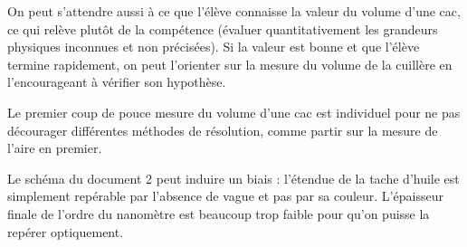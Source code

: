 \documentclass[12pt,a4paper]{article}
\begin{document}
On peut s'attendre aussi à ce que l'élève connaisse la valeur du volume d'une cac, ce qui relève plutôt de la compétence \app{} (évaluer quantitativement les grandeurs physiques inconnues et non précisées).
Si la valeur est bonne et que l'élève termine rapidement, on peut l'orienter sur la mesure du volume de la cuillère en l'encourageant à vérifier son hypothèse.

Le premier coup de pouce \og mesure du volume d'une cac \fg{} est individuel pour ne pas décourager différentes méthodes de résolution, comme partir sur la mesure de l'aire en premier. 

Le schéma du document 2 peut induire un biais : l'étendue de la tache d'huile est simplement repérable par l'absence de vague et pas par sa couleur.
L'épaisseur finale de l'ordre du nanomètre est beaucoup trop faible pour qu'on puisse la repérer optiquement.
\end{document}
